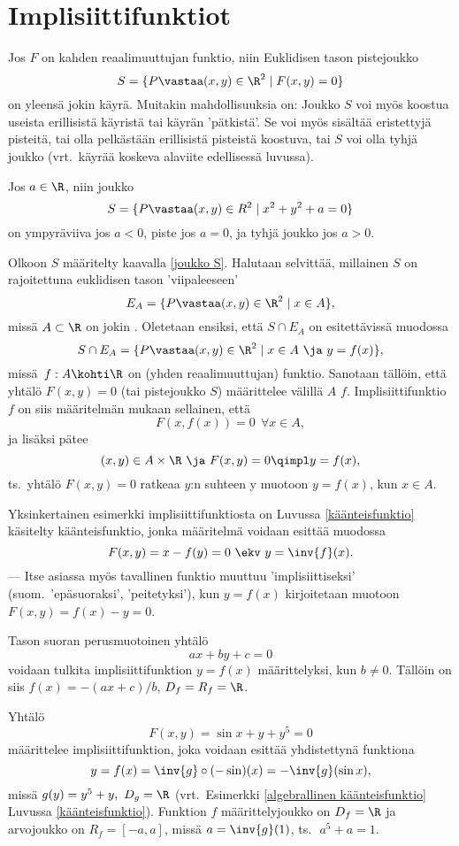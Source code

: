 \section{Implisiittifunktiot} \label{implisiittifunktiot} 
\alku

Jos $F$ on kahden reaalimuuttujan funktio, niin Euklidisen tason pistejoukko
\begin{equation}  \label{joukko S}
S=\{P \vastaa (x,y) \in \R^2 \mid F(x,y)=0\}
\end{equation}
on yleensä jokin käyrä. Muitakin mahdollisuuksia on: Joukko $S$ voi myös koostua useista 
erillisistä käyristä tai käyrän 'pätkistä'. Se voi myös sisältää eristettyjä pisteitä, tai olla
pelkästään erillisistä pisteistä koostuva, tai $S$ voi olla tyhjä joukko (vrt.\ käyrää koskeva
alaviite edellisessä luvussa).
\begin{Exa}
Jos $a \in \R$, niin joukko
\[ 
S = \{P \vastaa (x,y) \in R^2 \mid x^2+y^2+a = 0\} 
\]
on ympyräviiva jos $a<0$, piste jos $a=0$, ja tyhjä joukko jos $a>0$. \loppu 
\end{Exa}
Olkoon $S$ määritelty kaavalla \eqref{joukko S}. Halutaan selvittää, millainen $S$ on 
rajoitettuna  euklidisen tason 'viipaleeseen'
\[
E_A=\{P \vastaa (x,y) \in \R^2 \mid x \in A\},
\]
missä $A \subset \R$ on jokin . Oletetaan ensiksi, että $S\cap E_A$ on esitettävissä
muodossa
\[
S\cap E_A =\{P \vastaa (x,y) \in \R^2 \mid x \in A \ \ja \ y=f(x)\},
\]
missä $\,f:A \kohti \R$ on (yhden reaalimuuttujan) funktio. Sanotaan tällöin, että yhtälö 
$F(x,y)=0$ (tai pistejoukko $S$) määrittelee välillä $A$  $f$. 
Implisiittifunktio $f$ on siis määritelmän mukaan sellainen, että
\[
F(x,f(x))=0 \ \ \forall x \in A, 
\]
ja lisäksi pätee
\[ 
(x,y) \in A \times \R\ \ja\ F(x,y) = 0 \qimpl y = f(x), 
\]
ts.\ yhtälö $F(x,y)=0$ ratkeaa $y$:n suhteen y muotoon $y = f(x)$, 
kun $x\in A$.

Yksinkertainen esimerkki implisiittifunktiosta on Luvussa \ref{käänteisfunktio} käsitelty 
käänteisfunktio, jonka määritelmä voidaan esittää muodossa
\[
F(x,y)=x-f(y)=0 \ \ekv \ y=\inv{f}(x).
\]
--- Itse asiassa myös tavallinen funktio muuttuu 'implisiittiseksi' (suom.\ 'epäsuoraksi', 
'peitetyksi'), kun $y=f(x)$ kirjoitetaan muotoon $F(x,y)=f(x)-y=0$.
\begin{Exa}
Tason suoran perusmuotoinen yhtälö
\[
ax+by+c=0
\]
voidaan tulkita implisiittifunktion $y=f(x)$ määrittelyksi, kun $b\neq 0$. Tällöin on siis 
$f(x) = -(ax+c)/b$, $D_f = R_f = \R$. \loppu
\end{Exa}
\begin{Exa} Yhtälö 
\[
F(x,y) = \sin x + y + y^5 = 0
\]
määrittelee implisiittifunktion, joka voidaan esittää yhdistettynä funktiona
\[
y = f(x) = \inv{g} \circ (-\sin)(x) = -\inv{g}(\sin x),
\]
missä $g(y) = y^5 + y,\ D_g = \R$ (vrt.\ Esimerkki \ref{algebrallinen käänteisfunktio} 
Luvussa \ref{käänteisfunktio}). Funktion $f$ määrittelyjoukko on $D_f = \R$ ja arvojoukko on 
$R_f = [-a,a]$, missä $a = \inv{g}(1)$, ts.\ $\,a^5 + a = 1$. \loppu 
\end{Exa}

